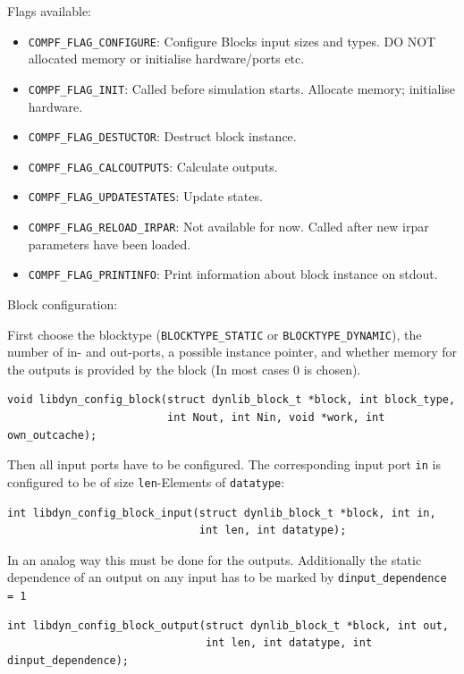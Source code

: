 \documentclass[%
	pdftex,%
	a4paper,%
	oneside,%
	11pt,%
	halfparskip,%
	headsepline,%
	bibtotocnumbered,%
	idxtotoc%
]{scrartcl}
\begin{document}
Flags available:

\begin{itemize}
 \item \texttt{COMPF\_FLAG\_CONFIGURE}: Configure Blocks input sizes and types. DO NOT allocated memory or initialise hardware/ports etc.
 \item \texttt{COMPF\_FLAG\_INIT}: Called before simulation starts. Allocate memory; initialise hardware.
 \item \texttt{COMPF\_FLAG\_DESTUCTOR}: Destruct block instance.
 \item \texttt{COMPF\_FLAG\_CALCOUTPUTS}: Calculate outputs.
 \item \texttt{COMPF\_FLAG\_UPDATESTATES}: Update states.
 \item \texttt{COMPF\_FLAG\_RELOAD\_IRPAR}: Not available for now. Called after new irpar parameters have been loaded.
 \item \texttt{COMPF\_FLAG\_PRINTINFO}: Print information about block instance on stdout.
\end{itemize}

Block configuration:

First choose the blocktype (\texttt{BLOCKTYPE\_STATIC} or \texttt{BLOCKTYPE\_DYNAMIC}), the number of in- and out-ports, a possible instance pointer, and whether memory for the outputs is provided by the block (In most cases 0 is chosen). 

\begin{verbatim}
void libdyn_config_block(struct dynlib_block_t *block, int block_type, 
                         int Nout, int Nin, void *work, int own_outcache);
\end{verbatim}

Then all input ports have to be configured. The corresponding input port  \texttt{in} is configured to be of size \texttt{len}-Elements of \texttt{datatype}:

\begin{verbatim}
int libdyn_config_block_input(struct dynlib_block_t *block, int in, 
                              int len, int datatype);
\end{verbatim}

In an analog way this must be done for the outputs. Additionally the static dependence of an output on any input has to be marked by \texttt{dinput\_dependence = 1}

\begin{verbatim}
int libdyn_config_block_output(struct dynlib_block_t *block, int out, 
                               int len, int datatype, int dinput_dependence);
\end{verbatim}
\end{document}
